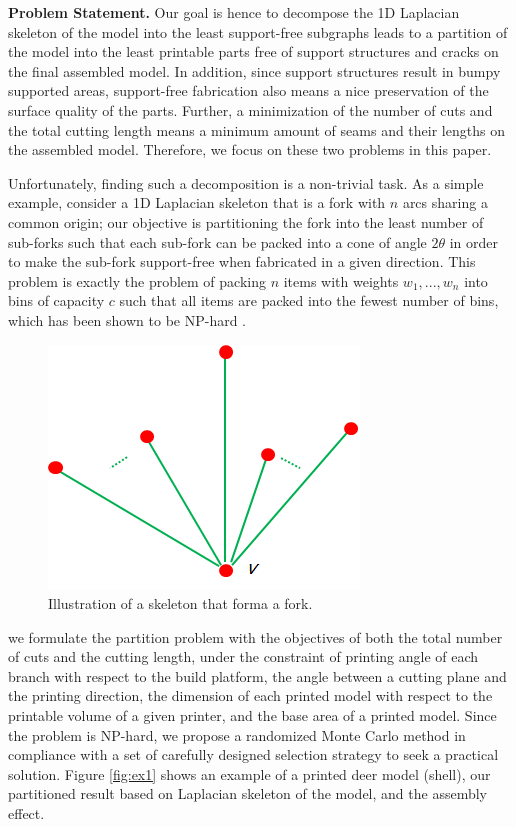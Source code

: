 \textbf{Problem Statement.} Our goal is hence to decompose the 1D Laplacian skeleton of the model into the least support-free subgraphs leads to a partition of the model into the least printable parts free of support structures and cracks on the final assembled model. In addition, since support structures result in bumpy supported areas, support-free fabrication also means a nice preservation of the surface quality of the parts. Further, a minimization of the number of cuts and the total cutting length means a minimum amount of seams and their lengths on the assembled model. Therefore, we focus on these two problems in this paper.

Unfortunately, finding such a decomposition is a non-trivial task. As a simple example, consider a 1{D} Laplacian skeleton that is a fork with $n$ arcs sharing a common origin; our objective is partitioning the fork into the least number of sub-forks such that each sub-fork can be packed into a cone of angle $2\theta$  in order to make the sub-fork support-free when fabricated in a given direction. This problem is exactly the problem of packing $n$ items with weights $w_1, ..., w_n$ into bins of capacity $c$ such that all items are packed into the fewest number of bins, which has been shown to be NP-hard \cite{Fukunaga:2007}.


\begin{figure}[tbp]
  \centering
  \includegraphics[width=0.45\linewidth]{figs/fork.png}
  \caption{\label{fig:fork}%
           Illustration of a skeleton that forma a fork.}
\end{figure}


we formulate the partition problem with the objectives of both the total number of cuts and the cutting length, under the constraint of printing angle of each branch with respect to the build platform, the angle between a cutting plane and the printing direction, the dimension of each printed model with respect to the printable volume of a given printer, and the base area of a printed model. Since the problem is NP-hard, we propose a randomized Monte Carlo method in compliance with a set of carefully designed selection strategy to seek a practical solution. Figure \ref{fig:ex1} shows an example of a printed deer model (shell), our partitioned result based on Laplacian skeleton of the model, and the assembly effect.


